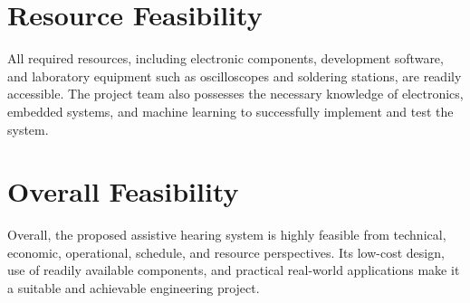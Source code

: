 \section{Resource Feasibility}
All required resources, including electronic components, development software, and laboratory equipment such as oscilloscopes and soldering stations, are readily accessible. The project team also possesses the necessary knowledge of electronics, embedded systems, and machine learning to successfully implement and test the system.
\section{Overall Feasibility}
Overall, the proposed assistive hearing system is highly feasible from technical, economic, operational, schedule, and resource perspectives. Its low-cost design, use of readily available components, and practical real-world applications make it a suitable and achievable engineering project.
